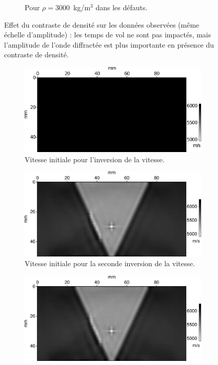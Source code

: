 \begin{figure}[!h]
\begin{subfigure}[b]{0.45\textwidth}
		\caption{Pour $\rho=3000$~kg/m$^{3}$ dans les défauts.}
	\end{subfigure}
	\caption{Effet du contraste de densité sur les données observées (même échelle d'amplitude) : les temps de vol ne sont pas impactés, mais l'amplitude de l'onde diffractée est plus importante en présence du contraste de densité. \label{app:traces_rho}}	
\end{figure}



	\begin{figure}[!h]
	\begin{changemargin}{-2cm}{-2cm}
		\centering
		\begin{subfigure}[b]{0.29\textwidth}
			\includegraphics[width=\textwidth]{img/mono_param/vp_uni.png}
			\caption{Vitesse initiale pour l'inversion de la vitesse.}
		\end{subfigure}
		\begin{subfigure}[b]{0.29\textwidth}
			\includegraphics[width=\textwidth]{img/mono_param/vp_smooth.png}
			\caption{Vitesse initiale pour la seconde inversion de la vitesse.}
		\end{subfigure}
		\begin{subfigure}[b]{0.29\textwidth}
			\includegraphics[width=\textwidth]{img/mono_param/vp_smooth.png}

\end{subfigure}
\end{changemargin}
\end{figure}
